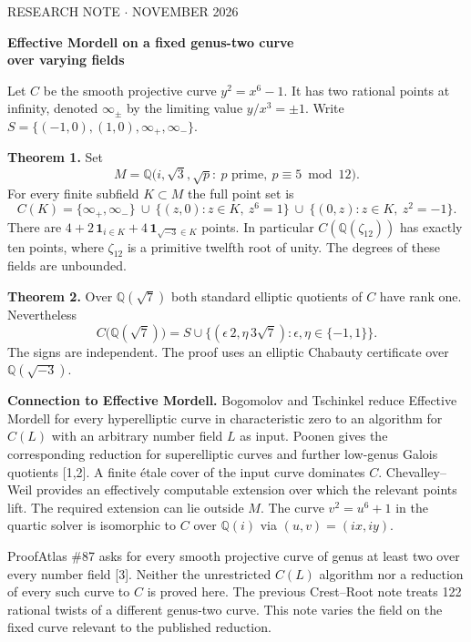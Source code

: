 \documentclass[12pt]{article}
\newcommand{\Q}{\mathbb Q}\newcommand{\Z}{\mathbb Z}
\begin{document}
{\small\sffamily\color{green}RESEARCH NOTE \quad $\cdot$  NOVEMBER 2026}\par
{\LARGE\bfseries\color{ink}Effective Mordell on a fixed genus-two curve\\over varying fields}\par
Let $C$ be the smooth projective curve $y^2=x^6-1$. It has two rational points at infinity, denoted $\infty_\pm$ by the limiting value $y/x^3=\pm1$. Write $S=\{(-1,0),(1,0),\infty_+,\infty_-\}$.

\textbf{Theorem 1.} Set
\[
 M=\Q\bigl(i,\sqrt3,\sqrt p:\ p\text{ prime},\ p\equiv5\bmod12\bigr).
\]
For every finite subfield $K\subset M$ the full point set is
\[
 C(K)=\{\infty_+,\infty_-\}\ \cup\
       \{(z,0):z\in K,\ z^6=1\}\ \cup\
       \{(0,z):z\in K,\ z^2=-1\}.
\]
There are $4+2\,\mathbf1_{i\in K}+4\,\mathbf1_{\sqrt{-3}\in K}$ points. In particular $C(\Q(\zeta_{12}))$ has exactly ten points, where $\zeta_{12}$ is a primitive twelfth root of unity.
The degrees of these fields are unbounded.

\textbf{Theorem 2.} Over $\Q(\sqrt7)$ both standard elliptic quotients of $C$ have rank one. Nevertheless
\[
 C\bigl(\Q(\sqrt7)\bigr)=S\cup\{(\epsilon\,2,\eta\,3\sqrt7):
                         \epsilon,\eta\in\{-1,1\}\}.
\]
The signs are independent. The proof uses an elliptic Chabauty certificate over $\Q(\sqrt{-3})$.

\textbf{Connection to Effective Mordell.} Bogomolov and Tschinkel reduce Effective Mordell for every hyperelliptic curve in characteristic zero to an algorithm for $C(L)$ with an arbitrary number field $L$ as input. Poonen gives the corresponding reduction for superelliptic curves and further low-genus Galois quotients [1,2]. A finite étale cover of the input curve dominates $C$. Chevalley--Weil provides an effectively computable extension over which the relevant points lift. The required extension can lie outside $M$. The curve $v^2=u^6+1$ in the quartic solver is isomorphic to $C$ over $\Q(i)$ via $(u,v)=(ix,iy)$.

ProofAtlas \#87 asks for every smooth projective curve of genus at least two over every number field [3]. Neither the unrestricted $C(L)$ algorithm nor a reduction of every such curve to $C$ is proved here. The previous Crest--Root note treats 122 rational twists of a different genus-two curve. This note varies the field on the fixed curve relevant to the published reduction.
\end{document}
